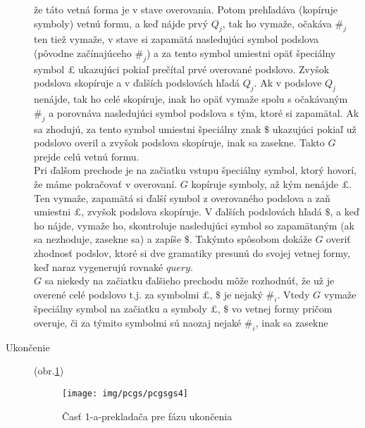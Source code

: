 \begin{dokaz}
\begin{description}
  že táto vetná forma je v stave overovania. Potom prehľadáva
  (kopíruje symboly) vetnú formu, a keď nájde prvý $Q_j$, tak ho
  vymaže, očakáva $\#_j$ ten tiež vymaže, v stave si zapamätá
  nasledujúci symbol podslova (pôvodne začínajúceho $\#_j$) a za
  tento symbol umiestni opäť špeciálny symbol $\pounds$ ukazujúci pokiaľ
  prečítal prvé overované podslovo. Zvyšok podslova skopíruje a v
  ďalších podslovách hľadá $Q_j$. Ak v podslove $Q_j$ nenájde, tak
  ho celé skopíruje, inak ho opäť vymaže spolu s očakávaným $\#_j$
  a porovnáva nasledujúci symbol podslova s tým, ktoré si
  zapamätal. Ak sa zhodujú, za tento symbol umiestni špeciálny
  znak $\$$ ukazujúci pokiaľ už podslovo overil a zvyšok podslova
  skopíruje, inak sa zasekne. Takto $G$ prejde celú vetnú formu.
  \\ Pri ďalšom prechode je na začiatku vstupu špeciálny symbol,
  ktorý hovorí, že máme pokračovať v overovaní. $G$ kopíruje
  symboly, až kým nenájde $\pounds$. Ten vymaže, zapamätá si ďalší
  symbol z overovaného podslova a zaň umiestni $\pounds$, zvyšok
  podslova skopíruje. V ďalších podslovách hľadá $\$$, a keď ho
  nájde, vymaže ho, skontroluje nasledujúci symbol so zapamätaným
  (ak sa nezhoduje, zasekne sa) a zapíše $\$$. Takýmto spôsobom
  dokáže $G$ overiť zhodnosť podslov, ktoré si dve gramatiky
  presunú do svojej vetnej formy, keď naraz vygenerujú rovnaké
  $query$.
  \\ $G$ sa niekedy na začiatku ďalšieho prechodu môže rozhodnúť,
  že už je overené celé podslovo t.j. za symbolmi $\pounds$, $\$$
  je nejaký $\#_i$. Vtedy $G$ vymaže špeciálny symbol na začiatku
  a symboly $\pounds$, $\$$ vo vetnej formy pričom overuje, či za
  týmito symbolmi sú naozaj nejaké $\#_i$, inak sa zasekne

  \item[Ukončenie] (obr.\ref{pcgsgs4})

\begin{figure}[ht]
  \centering
  \texttt{[image: img/pcgs/pcgsgs4]}
  \caption{Časť 1-a-prekladača pre fázu ukončenia}\label{pcgsgs4}
\end{figure}


\end{description}
\end{dokaz}

